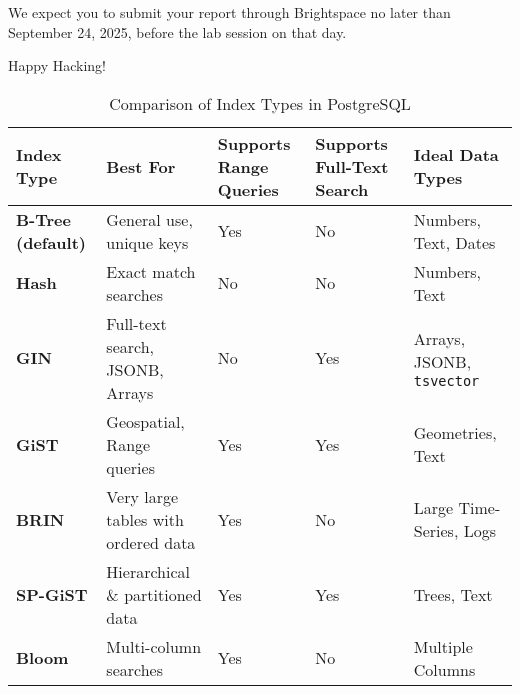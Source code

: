 \documentclass{article}
\begin{document}
We expect you to submit your report through Brightspace\texttrademark{} no later than September 24, 2025, before the lab session on that day.

\vspace{5mm}
Happy Hacking! 

\begin{table}
    \centering
    \renewcommand{\arraystretch}{1.3}
    \begin{tabular}{p{1.75cm} p{4cm} p{2cm} p{2cm} p{4cm}}
		\toprule
        \textbf{Index Type} & \textbf{Best For} & \textbf{Supports Range Queries} & \textbf{Supports Full-Text Search} & \textbf{Ideal Data Types} \\
        \midrule
        \textbf{B-Tree (default)} & General use, unique keys & Yes & No & Numbers, Text, Dates \\
        \textbf{Hash} & Exact match searches & No & No & Numbers, Text \\
        \textbf{GIN} & Full-text search, JSONB, Arrays & No & Yes & Arrays, JSONB, \texttt{tsvector} \\
        \textbf{GiST} & Geospatial, Range queries & Yes & Yes & Geometries, Text \\
        \textbf{BRIN} & Very large tables with ordered data & Yes & No & Large Time-Series, Logs \\
        \textbf{SP-GiST} & Hierarchical \& partitioned data & Yes & Yes & Trees, Text \\
        \textbf{Bloom} & Multi-column searches & Yes & No & Multiple Columns \\
        \bottomrule
    \end{tabular}
    \caption{Comparison of Index Types in PostgreSQL}
    \label{tab:postgresql_indexes}
\end{table}
\end{document}
